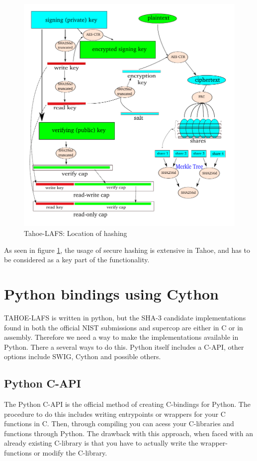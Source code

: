 \documentclass[english,12pt,a4paper]{book}
\begin{document}
\begin{figure}[h]
    \centering
    \includegraphics[width=0.9\columnwidth]{Tahoe-hashing.pdf}
    \caption{Tahoe-LAFS: Location of hashing}
    \label{fig:tahoehashing}
\end{figure}

As seen in figure \ref{fig:tahoehashing}, the usage of secure hashing is
extensive in Tahoe, and has to be considered as a key part of the functionality.


\section{Python bindings using Cython}
TAHOE-LAFS is written in python, but the SHA-3 candidate implementations found
in both the official NIST submissions and supercop are either in C or in
assembly. Therefore we need a way to make the implementations available in
Python. There a several ways to do this. Python itself includes a C-API,  
other options include SWIG, Cython and possible others.

\subsection{Python C-API}
The Python C-API is the official method of creating C-bindings for Python. The
procedure to do this includes writing entrypoints or wrappers for your C
functions in C. Then, through compiling you can acess your C-libraries and
functions through Python. The drawback with this approach, when faced with an
already existing C-library is that you have to actually write the
wrapper-functions or modify the C-library.
\end{document}
